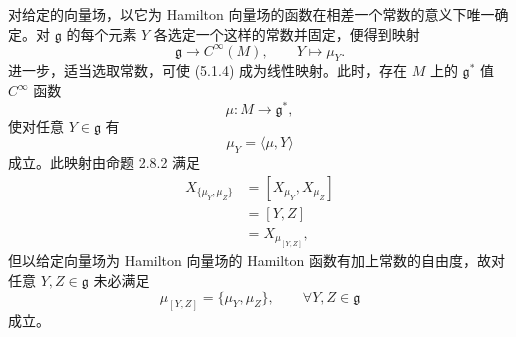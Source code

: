 
对给定的向量场，以它为 Hamilton 向量场的函数在相差一个常数的意义下唯一确定。对 $\mathfrak{g}$ 的每个元素 $Y$ 各选定一个这样的常数并固定，便得到映射
\begin{equation}
  \mathfrak{g}\to C^\infty(M),\qquad Y\mapsto\mu_Y.
  \tag{5.1.4}
\end{equation}
进一步，适当选取常数，可使 (5.1.4) 成为线性映射。此时，存在 $M$ 上的 $\mathfrak{g}^*$ 值 $C^\infty$ 函数
\begin{equation}
  \mu\colon M\to\mathfrak{g}^*,
  \tag{5.1.5}
\end{equation}
使对任意 $Y\in\mathfrak{g}$ 有
\begin{equation}
  \mu_Y=\langle\mu,Y\rangle
  \tag{5.1.6}
\end{equation}
成立。此映射由命题 2.8.2 满足
\begin{align}
  X_{\{\mu_Y,\mu_Z\}}&=[X_{\mu_Y},X_{\mu_Z}] \tag{5.1.7}\\
  &=[Y,Z] \tag{5.1.8}\\
  &=X_{\mu_{[Y,Z]}}, \tag{5.1.9}
\end{align}
但以给定向量场为 Hamilton 向量场的 Hamilton 函数有加上常数的自由度，故对任意 $Y,Z\in\mathfrak{g}$ 未必满足
\begin{equation}
  \mu_{[Y,Z]}=\{\mu_Y,\mu_Z\},\qquad \forall Y,Z\in\mathfrak{g}
  \tag{5.1.10}
\end{equation}
成立。

